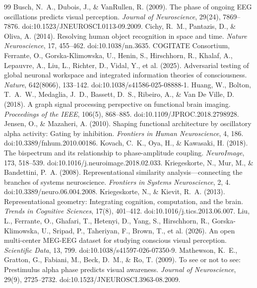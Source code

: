 \documentclass[11pt]{article}
\begin{document}
\begin{thebibliography}{99}
 Busch, N.~A., Dubois, J., \& VanRullen, R. (2009). The phase of ongoing EEG oscillations predicts visual perception. \emph{Journal of Neuroscience}, 29(24), 7869--7876. doi:10.1523/JNEUROSCI.0113-09.2009.
 Cichy, R.~M., Pantazis, D., \& Oliva, A. (2014). Resolving human object recognition in space and time. \emph{Nature Neuroscience}, 17, 455--462. doi:10.1038/nn.3635.
 COGITATE Consortium, Ferrante, O., Gorska-Klimowska, U., Henin, S., Hirschhorn, R., Khalaf, A., Lepauvre, A., Liu, L., Richter, D., Vidal, Y., et al. (2025). Adversarial testing of global neuronal workspace and integrated information theories of consciousness. \emph{Nature}, 642(8066), 133--142. doi:10.1038/s41586-025-08888-1.
 Huang, W., Bolton, T.~A.~W., Medaglia, J.~D., Bassett, D.~S., Ribeiro, A., \& Van De Ville, D. (2018). A graph signal processing perspective on functional brain imaging. \emph{Proceedings of the IEEE}, 106(5), 868--885. doi:10.1109/JPROC.2018.2798928.
 Jensen, O., \& Mazaheri, A. (2010). Shaping functional architecture by oscillatory alpha activity: Gating by inhibition. \emph{Frontiers in Human Neuroscience}, 4, 186. doi:10.3389/fnhum.2010.00186.
 Kovach, C.~K., Oya, H., \& Kawasaki, H. (2018). The bispectrum and its relationship to phase-amplitude coupling. \emph{NeuroImage}, 173, 518--539. doi:10.1016/j.neuroimage.2018.02.033.
 Kriegeskorte, N., Mur, M., \& Bandettini, P.~A. (2008). Representational similarity analysis---connecting the branches of systems neuroscience. \emph{Frontiers in Systems Neuroscience}, 2, 4. doi:10.3389/neuro.06.004.2008.
 Kriegeskorte, N., \& Kievit, R.~A. (2013). Representational geometry: Integrating cognition, computation, and the brain. \emph{Trends in Cognitive Sciences}, 17(8), 401--412. doi:10.1016/j.tics.2013.06.007.
 Liu, L., Ferrante, O., Ghafari, T., Hetenyi, D., Yang, S., Hirschhorn, R., Gorska-Klimowska, U., Sripad, P., Taheriyan, F., Brown, T., et al. (2026). An open multi-center MEG-EEG dataset for studying conscious visual perception. \emph{Scientific Data}, 13, 799. doi:10.1038/s41597-026-07350-9.
 Mathewson, K.~E., Gratton, G., Fabiani, M., Beck, D.~M., \& Ro, T. (2009). To see or not to see: Prestimulus alpha phase predicts visual awareness. \emph{Journal of Neuroscience}, 29(9), 2725--2732. doi:10.1523/JNEUROSCI.3963-08.2009.

\end{thebibliography}
\end{document}
